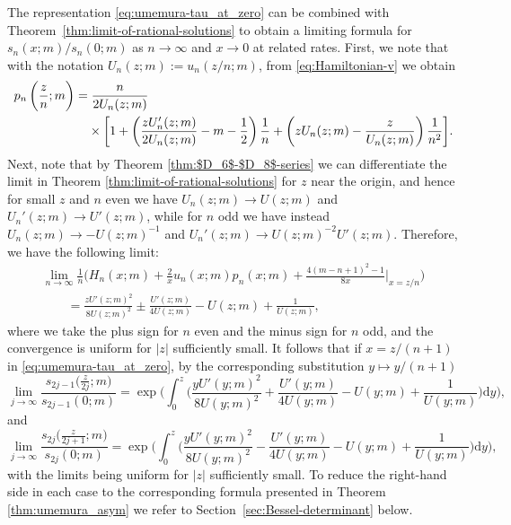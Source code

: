 \documentclass[pdftex]{sigma}
\numberwithin{equation}{section}
\newcommand{\dd}{\mathrm{d}}
\begin{document}
The representation \eqref{eq:umemura-tau_at_zero} can be combined with Theorem~\ref{thm:limit-of-rational-solutions} to obtain a limiting formula for~$s_n(x;m)/s_n(0;m)$ as $n\to\infty$ and $x\to 0$ at related rates. First, we note that with the notation $U_n(z;m):=u_n(z/n;m)$, from \eqref{eq:Hamiltonian-v} we obtain
\begin{align*}
 &p_n\left(\frac{z}{n};m\right)= \frac{n}{2U_n(z;m)}\\
 &\hphantom{p_n\left(\frac{z}{n};m\right)=}{} \times\bigg[1+\left(\frac{zU_n'(z;m)}{2U_n(z;m)}-m-\frac{1}{2}\right)\frac{1}{n}+\left(zU_n(z;m)-\frac{z}{U_n(z;m)}\right)\frac{1}{n^2}\bigg].
\end{align*}
Next, note that by Theorem \ref{thm:$D_6$-$D_8$-series} we can differentiate the limit in Theorem \ref{thm:limit-of-rational-solutions} for $z$ near the origin, and hence for small $z$ and $n$ even we have $U_n(z;m)\to U(z;m)$ and $U_n'(z;m)\to U'(z;m)$, while for $n$ odd we have instead $U_n(z;m)\to -U(z;m)^{-1}$ and $U_n'(z;m)\to U(z;m)^{-2}U'(z;m)$. Therefore, we have the following limit:
\begin{gather*}
\lim_{n\to\infty}\frac{1}{n}\bigg( H_n(x;m)+\frac{2}{x}u_n(x;m)p_n(x;m) +\frac{4(m-n+1)^2-1}{8x}\bigg|_{x=z/n}\bigg)\\
\qquad=\frac{zU'(z;m)^2}{8U(z;m)^2}\pm\frac{U'(z;m)}{4U(z;m)}-U(z;m)+\frac{1}{U(z;m)},
\end{gather*}
where we take the plus sign for $n$ even and the minus sign for $n$ odd, and the convergence is uniform for $|z|$ sufficiently small. It follows that if $x=z/(n+1)$ in \eqref{eq:umemura-tau_at_zero}, by the corresponding substitution $y\mapsto y/(n+1)$
\begin{equation}
\lim_{j\to\infty}\frac{s_{2j-1} \big(\frac{z}{2j} ;m\big)}{s_{2j-1}(0;m)}= \exp \bigg(\int_0^{z}\bigg(\frac{y U'(y;m)^2}{8 U(y;m)^2}+\frac{U'(y;m)}{4 U(y;m)}-U(y;m)+\frac{1}{U(y;m)}\bigg) \dd y\bigg),
\label{eq:umemura-asymtotics-2}
\end{equation}
and
\begin{equation}
 \lim_{j\to\infty}\frac{s_{2j}\big( \frac{z}{2j+1};m \big)}{s_{2j}(0;m)}=\exp\bigg(\displaystyle\int_0^z\bigg(\frac{y U'(y;m)^2}{8 U(y;m)^2}-\frac{U'(y;m)}{4 U(y;m)}-U(y;m)+\frac{1}{U(y;m)}\bigg) \dd y\bigg),
\label{eq:umemura-asymtotics-1}
\end{equation}
with the limits being uniform for $|z|$ sufficiently small.
To reduce the right-hand side in each case to the corresponding formula presented in Theorem \ref{thm:umemura_asym} we refer to Section~\ref{sec:Bessel-determinant} below.
\end{document}
